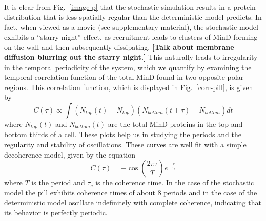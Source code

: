 \documentclass[10pt,letterpaper]{article}
\newcommand{\red}[1]{{\bf \color{red} #1}}
\newcommand{\fixme}[1]{\red{[#1]}}
\begin{document}
It is clear from Fig.~\ref{image-p} that the stochastic simulation
results in a protein distribution that is less spatially regular than
the deterministic model predicts.  In fact, when viewed as a movie
(see supplementary material), the stochastic model exhibits a ``starry
night'' effect, as recruitment leads to clusters of MinD forming on
the wall and then subsequently dissipating.  \fixme{Talk about
  membrane diffusion blurring out the starry night.}  This naturally
leads to irregularity in the temporal periodicity of the system, which
we quantify by examining the temporal correlation function of the
total MinD found in two opposite polar regions.
%
This correlation function, which is displayed in Fig.~\ref{corr-pill},
is given by
\begin{equation}
  C(\tau) \propto \int
  (N_{\textit{top}}(t) - \bar N_{\textit{top}})
  (N_{\textit{bottom}}(t+\tau) - \bar N_{\textit{bottom}})dt
\end{equation}
where $N_{\textit{top}}(t)$ and $N_{\textit{bottom}}(t)$ are the total
MinD proteins in the top and bottom thirds of a cell.  These plots
help us in studying the periods and the regularity and stability of
oscillations.  These curves are well fit with a simple decoherence
model, given by the equation
\begin{equation}
  C(\tau) = -\cos\left(\frac{2\pi\tau}{T}\right) e^{-\frac{\tau}{\tau_c}}
\end{equation}
where $T$ is the period and $\tau_c$ is the coherence time.  In the
case of the stochastic model the pill exhibits coherence times of
about 8 periods and in the case of the deterministic model oscillate
indefinitely with complete coherence, indicating that its behavior is
perfectly periodic.
\end{document}
